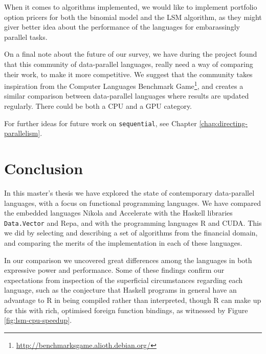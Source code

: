 When it comes to algorithms implemented, we would like to implement
portfolio option pricers for both the binomial model and the LSM
algorithm, as they might giver better idea about the performance of
the languages for embarassingly parallel tasks.

On a final note about the future of our survey, we have during the
project found that this community of data-parallel languages, really
need a way of comparing their work, to make it more competitive. We
suggest that the community takes inspiration from the Computer
Languages Benchmark
Game\footnote{\url{http://benchmarksgame.alioth.debian.org/}}, and
creates a similar comparison between data-parallel languages where
results are updated regularly. There could be both a CPU and a GPU
category.

For further ideas for future work on \lstinline{sequential}, see
Chapter \ref{chap:directing-parallelism}.



\section{Conclusion}
\label{sec:conclusion}

In this master's thesis we have explored the state of contemporary
data-parallel languages, with a focus on functional programming
languages. We have compared the embedded languages Nikola and
Accelerate with the Haskell libraries \lstinline{Data.Vector} and
Repa, and with the programming languages R and CUDA.  This we did by
selecting and describing a set of algorithms from the financial
domain, and comparing the merits of the implementation in each of
these languages.

In our comparison we uncovered great differences among the languages in both
expressive power and performance. Some of these findings confirm our
expectations from inspection of the superficial circumstances regarding each
language, such as the conjecture that Haskell programs in general have an
advantage to R in being compiled rather than interpreted, though R can make up
for this with rich, optimised foreign function bindings, as witnessed by Figure
\ref{fig:lsm-cpu-speedup}.


